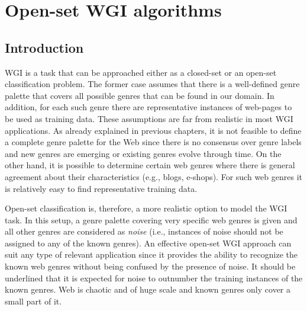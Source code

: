 
\chapter{Open-set WGI algorithms}

\label{chap:openset}


\newcommand{\keyword}[1]{\textbf{#1}}
\newcommand{\tabhead}[1]{\textbf{#1}}
\newcommand{\code}[1]{\texttt{#1}}
\newcommand{\file}[1]{\texttt{\bfseries#1}}
\newcommand{\option}[1]{\texttt{\itshape#1}}


\section{Introduction}\label{chap:openset:sec:intro}

WGI is a task that can be approached either as a closed-set or an open-set classification problem. The former case assumes that there is a well-defined genre palette that covers all possible genres that can be found in our domain. In addition, for each such genre there are representative instances of web-pages to be used as training data. These assumptions are far from realistic in most WGI applications. As already explained in previous chapters, it is not feasible to define a complete genre palette for the Web since there is no consensus over genre labels and new genres are emerging or existing genres evolve through time. On the other hand, it is possible to determine certain web genres where there is general agreement about their characteristics (e.g., blogs, e-shops). For such web genres it is relatively easy to find representative training data. 

Open-set classification is, therefore, a more realistic option to model the WGI task. In this setup, a genre palette covering very specific web genres is given and all other genres are considered as \textit{noise} (i.e., instances of noise should not be assigned to any of the known genres). An effective open-set WGI approach can suit any type of relevant application since it provides the ability to recognize the known web genres without being confused by the presence of noise. It should be underlined that it is expected for noise to outnumber the training instances of the known genres. Web is chaotic and of huge scale and known genres only cover a small part of it.

